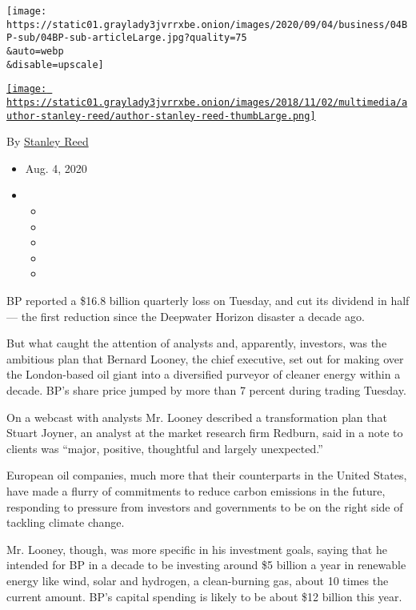 \texttt{[image: https://static01.graylady3jvrrxbe.onion/images/2020/09/04/business/04BP-sub/04BP-sub-articleLarge.jpg?quality=75\\\&auto=webp\\\&disable=upscale]}

\href{https://www.nytimes3xbfgragh.onion/by/stanley-reed}{\texttt{[image: https://static01.graylady3jvrrxbe.onion/images/2018/11/02/multimedia/author-stanley-reed/author-stanley-reed-thumbLarge.png]}}

By \href{https://www.nytimes3xbfgragh.onion/by/stanley-reed}{Stanley
Reed}

\begin{itemize}
\item
  Aug. 4, 2020
\item
  \begin{itemize}
  \item
  \item
  \item
  \item
  \item
  \end{itemize}
\end{itemize}

BP reported a \$16.8 billion quarterly loss on Tuesday, and cut its
dividend in half --- the first reduction since the Deepwater Horizon
disaster a decade ago.

But what caught the attention of analysts and, apparently, investors,
was the ambitious plan that Bernard Looney, the chief executive, set out
for making over the London-based oil giant into a diversified purveyor
of cleaner energy within a decade. BP's share price jumped by more than
7 percent during trading Tuesday.

On a webcast with analysts Mr. Looney described a transformation plan
that Stuart Joyner, an analyst at the market research firm Redburn, said
in a note to clients was ``major, positive, thoughtful and largely
unexpected.''

European oil companies, much more that their counterparts in the United
States, have made a flurry of commitments to reduce carbon emissions in
the future, responding to pressure from investors and governments to be
on the right side of tackling climate change.

Mr. Looney, though, was more specific in his investment goals, saying
that he intended for BP in a decade to be investing around \$5 billion a
year in renewable energy like wind, solar and hydrogen, a clean-burning
gas, about 10 times the current amount. BP's capital spending is likely
to be about \$12 billion this year.

